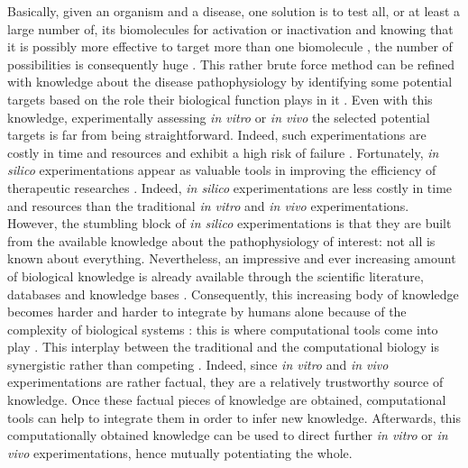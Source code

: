 \documentclass[oneside,a4paper,onecolumn,notitlepage]{article}
\begin{document}
Basically, given an organism and a disease, one solution is to test all, or at least a large number of, its biomolecules for activation or inactivation and knowing that it is possibly more effective to target more than one biomolecule \cite{zimmermann2007multi}, the number of possibilities is consequently huge \cite{ohlstein2000drug}. This rather brute force method can be refined with knowledge about the disease pathophysiology by identifying some potential targets based on the role their biological function plays in it \cite{gibbs2000mechanism}. Even with this knowledge, experimentally assessing \textit{in vitro} or \textit{in vivo} the selected potential targets is far from being straightforward. Indeed, such experimentations are costly in time and resources and exhibit a high risk of failure \cite{kaitin2010deconstructing}. Fortunately, \textit{in silico} experimentations appear as valuable tools in improving the efficiency of therapeutic researches \cite{ma2010silico,noble1999biological}. Indeed, \textit{in silico} experimentations are less costly in time and resources than the traditional \textit{in vitro} and \textit{in vivo} experimentations. However, the stumbling block of \textit {in silico} experimentations is that they are built from the available knowledge about the pathophysiology of interest: not all is known about everything. Nevertheless, an impressive and ever increasing amount of biological knowledge is already available through the scientific literature, databases and knowledge bases \cite{chen2002ttd,whirl2012pharmacogenomics,kanehisa2000kegg,croft2011reactome,wishart2008drugbank}. Consequently, this increasing body of knowledge becomes harder and harder to integrate by humans alone because of the complexity of biological systems \cite{kitano2002systems}: this is where computational tools come into play \cite{kitano2002computational}. This interplay between the traditional and the computational biology is synergistic rather than competing \cite{di2006vivo}. Indeed, since \textit{in vitro} and \textit{in vivo} experimentations are rather factual, they are a relatively trustworthy source of knowledge. Once these factual pieces of knowledge are obtained, computational tools can help to integrate them in order to infer new knowledge. Afterwards, this computationally obtained knowledge can be used to direct further \textit{in vitro} or \textit{in vivo} experimentations, hence mutually potentiating the whole.
\end{document}
